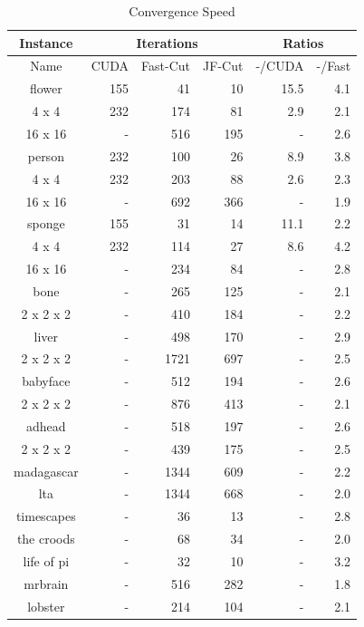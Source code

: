 \begin{table}
\center
\caption{Convergence Speed}
\label{table convergence speed}
{
    \fontsize{6.5pt}{7.5pt}\selectfont
    \begin{tabular}{@{ }c|r@{ }r@{ }r|r@{ }r@{ }}
    \hline
    Instance & \multicolumn{3}{|c|}{Iterations} & \multicolumn{2}{c}{Ratios}\\
    \hline
    Name & CUDA & Fast-Cut & JF-Cut & -/CUDA & -/Fast\\
    \hline
    flower      & 155   & 41    & 10    & 15.5  & 4.1\\
    4 x 4       & 232   & 174   & 81    & 2.9   & 2.1\\
    16 x 16     & -     & 516   & 195   & -     & 2.6\\
    person      & 232   & 100   & 26    & 8.9   & 3.8\\
    4 x 4       & 232   & 203   & 88    & 2.6   & 2.3\\
    16 x 16     & -     & 692   & 366   & -     & 1.9\\
    sponge      & 155   & 31    & 14    & 11.1  & 2.2\\
    4 x 4       & 232   & 114   & 27    & 8.6   & 4.2\\
    16 x 16     & -     & 234   & 84    & -     & 2.8\\
    \hline
    bone        & -     & 265   & 125   & -     & 2.1\\
    2 x 2 x 2   & -     & 410   & 184   & -     & 2.2\\
    liver       & -     & 498   & 170   & -     & 2.9\\
    2 x 2 x 2   & -     & 1721  & 697   & -     & 2.5\\
    babyface    & -     & 512   & 194   & -     & 2.6\\
    2 x 2 x 2   & -     & 876   & 413   & -     & 2.1\\
    adhead      & -     & 518   & 197   & -     & 2.6\\
    2 x 2 x 2   & -     & 439   & 175   & -     & 2.5\\
    \hline
    madagascar  & -     & 1344  & 609   & -     & 2.2\\
    lta         & -     & 1344  & 668   & -     & 2.0\\
    \hline
    timescapes  & -     & 36    & 13    & -     & 2.8\\
    the croods  & -     & 68    & 34    & -     & 2.0\\
    life of pi  & -     & 32    & 10    & -     & 3.2\\
    \hline
    mrbrain     & -     & 516   & 282   & -     & 1.8\\
    lobster     & -     & 214   & 104   & -     & 2.1\\
    \hline
    \end{tabular}
}
\end{table}

